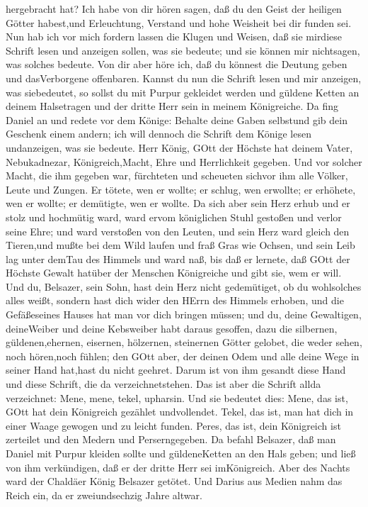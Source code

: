 hergebracht hat?  Ich habe von dir hören sagen, daß du den
Geist der heiligen Götter habest,und Erleuchtung, Verstand und hohe
Weisheit bei dir funden sei.  Nun hab ich vor mich fordern
lassen die Klugen und Weisen, daß sie mirdiese Schrift lesen und
anzeigen sollen, was sie bedeute; und sie können mir nichtsagen, was
solches bedeute.  Von dir aber höre ich, daß du könnest die
Deutung geben und dasVerborgene offenbaren. Kannst du nun die Schrift
lesen und mir anzeigen, was siebedeutet, so sollst du mit Purpur
gekleidet werden und güldene Ketten an deinem Halsetragen und der dritte
Herr sein in meinem Königreiche.  Da fing Daniel an und
redete vor dem Könige: Behalte deine Gaben selbstund gib dein Geschenk
einem andern; ich will dennoch die Schrift dem Könige lesen undanzeigen,
was sie bedeute.  Herr König, GOtt der Höchste hat deinem
Vater, Nebukadnezar, Königreich,Macht, Ehre und Herrlichkeit gegeben.
 Und vor solcher Macht, die ihm gegeben war, fürchteten und
scheueten sichvor ihm alle Völker, Leute und Zungen. Er tötete, wen er
wollte; er schlug, wen erwollte; er erhöhete, wen er wollte; er
demütigte, wen er wollte.  Da sich aber sein Herz erhub und
er stolz und hochmütig ward, ward ervom königlichen Stuhl gestoßen und
verlor seine Ehre;  und ward verstoßen von den Leuten, und
sein Herz ward gleich den Tieren,und mußte bei dem Wild laufen und fraß
Gras wie Ochsen, und sein Leib lag unter demTau des Himmels und ward
naß, bis daß er lernete, daß GOtt der Höchste Gewalt hatüber der
Menschen Königreiche und gibt sie, wem er will.  Und du,
Belsazer, sein Sohn, hast dein Herz nicht gedemütiget, ob du wohlsolches
alles weißt,  sondern hast dich wider den HErrn des Himmels
erhoben, und die Gefäßeseines Hauses hat man vor dich bringen müssen;
und du, deine Gewaltigen, deineWeiber und deine Kebsweiber habt daraus
gesoffen, dazu die silbernen, güldenen,ehernen, eisernen, hölzernen,
steinernen Götter gelobet, die weder sehen, noch hören,noch fühlen; den
GOtt aber, der deinen Odem und alle deine Wege in seiner Hand hat,hast
du nicht geehret.  Darum ist von ihm gesandt diese Hand und
diese Schrift, die da verzeichnetstehen.  Das ist aber die
Schrift allda verzeichnet: Mene, mene, tekel, upharsin. 
Und sie bedeutet dies: Mene, das ist, GOtt hat dein Königreich gezählet
undvollendet.  Tekel, das ist, man hat dich in einer Waage
gewogen und zu leicht funden.  Peres, das ist, dein
Königreich ist zerteilet und den Medern und Perserngegeben.
 Da befahl Belsazer, daß man Daniel mit Purpur kleiden
sollte und güldeneKetten an den Hals geben; und ließ von ihm
verkündigen, daß er der dritte Herr sei imKönigreich.  Aber
des Nachts ward der Chaldäer König Belsazer getötet.  Und
Darius aus Medien nahm das Reich ein, da er zweiundsechzig Jahre altwar.


